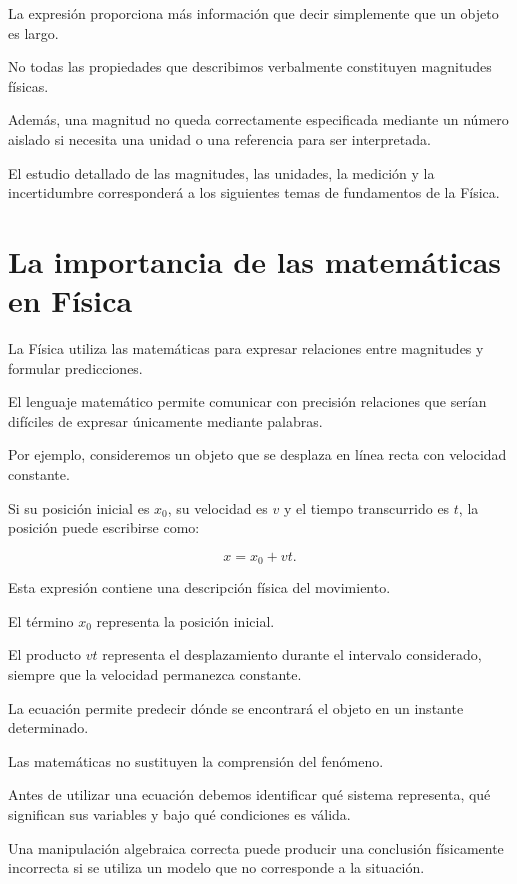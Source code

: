 La expresión proporciona más información
que decir simplemente que un objeto es largo.

\begin{advertencia}

No todas las propiedades que describimos verbalmente
constituyen magnitudes físicas.

Además, una magnitud no queda correctamente especificada
mediante un número aislado si necesita una unidad
o una referencia para ser interpretada.

\end{advertencia}

El estudio detallado de las magnitudes,
las unidades, la medición y la incertidumbre
corresponderá a los siguientes temas
de fundamentos de la Física.


\section{La importancia de las matemáticas en Física}

La Física utiliza las matemáticas para expresar
relaciones entre magnitudes y formular predicciones.

El lenguaje matemático permite comunicar
con precisión relaciones que serían difíciles
de expresar únicamente mediante palabras.

Por ejemplo, consideremos un objeto que se desplaza
en línea recta con velocidad constante.

Si su posición inicial es \(x_0\), su velocidad
es \(v\) y el tiempo transcurrido es \(t\),
la posición puede escribirse como:

\[x=x_0+vt.\]

Esta expresión contiene una descripción física
del movimiento.

El término \(x_0\) representa la posición inicial.

El producto \(vt\) representa el desplazamiento
durante el intervalo considerado, siempre
que la velocidad permanezca constante.

La ecuación permite predecir dónde se encontrará
el objeto en un instante determinado.

\begin{interpretacion}

Las matemáticas no sustituyen la comprensión
del fenómeno.

Antes de utilizar una ecuación debemos identificar
qué sistema representa, qué significan sus variables
y bajo qué condiciones es válida.

Una manipulación algebraica correcta puede producir
una conclusión físicamente incorrecta si se utiliza
un modelo que no corresponde a la situación.

\end{interpretacion}


